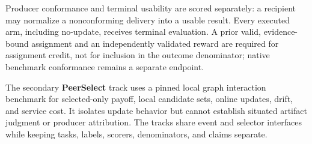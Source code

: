 \documentclass[sigconf,anonymous]{aamas}
\begin{document}
Producer conformance and terminal usability are scored separately: a recipient may normalize a nonconforming delivery into a usable result. Every executed arm, including no-update, receives terminal evaluation. A prior valid, evidence-bound assignment and an independently validated reward are required for assignment credit, not for inclusion in the outcome denominator; native benchmark conformance remains a separate endpoint.

The secondary \textbf{PeerSelect} track uses a pinned local graph interaction benchmark for selected-only payoff, local candidate sets, online updates, drift, and service cost. It isolates update behavior but cannot establish situated artifact judgment or producer attribution. The tracks share event and selector interfaces while keeping tasks, labels, scorers, denominators, and claims separate.
\end{document}
